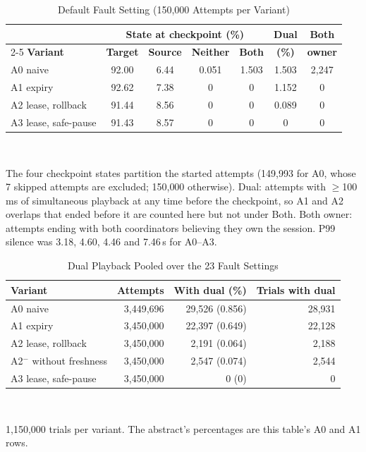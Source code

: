\documentclass[conference]{IEEEtran}
\begin{document}
\begin{table}[t]
\caption{Default Fault Setting (150{,}000 Attempts per Variant)}
\label{tab:default}
\centering
\footnotesize
\setlength{\tabcolsep}{3.2pt}
\begin{tabular}{@{}lcccccc@{}}
\toprule
 & \multicolumn{4}{c}{\textbf{State at checkpoint (\%)}} & \textbf{Dual} & \textbf{Both} \\
\cmidrule(lr){2-5}
\textbf{Variant} & \textbf{Target} & \textbf{Source} & \textbf{Neither} & \textbf{Both} & \textbf{(\%)} & \textbf{owner} \\
\midrule
A0 naive & 92.00 & 6.44 & 0.051 & 1.503 & 1.503 & 2{,}247 \\
A1 expiry & 92.62 & 7.38 & 0 & 0 & 1.152 & 0 \\
A2 lease, rollback & 91.44 & 8.56 & 0 & 0 & 0.089 & 0 \\
A3 lease, safe-pause & 91.43 & 8.57 & 0 & 0 & 0 & 0 \\
\bottomrule
\end{tabular}
\\[2pt]
\parbox{\columnwidth}{\scriptsize The four checkpoint states partition the started attempts (149{,}993 for A0, whose 7 skipped attempts are excluded; 150{,}000 otherwise). Dual: attempts with $\ge$100\,ms of simultaneous playback at any time before the checkpoint, so A1 and A2 overlaps that ended before it are counted here but not under Both. Both owner: attempts ending with both coordinators believing they own the session. P99 silence was 3.18, 4.60, 4.46 and 7.46\,s for A0--A3.}
\end{table}

\begin{table}[t]
\caption{Dual Playback Pooled over the 23 Fault Settings}
\label{tab:pooled}
\centering
\footnotesize
\begin{tabular}{@{}lrrr@{}}
\toprule
\textbf{Variant} & \textbf{Attempts} & \textbf{With dual (\%)} & \textbf{Trials with dual} \\
\midrule
A0 naive & 3{,}449{,}696 & 29{,}526 (0.856) & 28{,}931 \\
A1 expiry & 3{,}450{,}000 & 22{,}397 (0.649) & 22{,}128 \\
A2 lease, rollback & 3{,}450{,}000 & 2{,}191 (0.064) & 2{,}188 \\
A2$^-$ without freshness & 3{,}450{,}000 & 2{,}547 (0.074) & 2{,}544 \\
A3 lease, safe-pause & 3{,}450{,}000 & 0 (0) & 0 \\
\bottomrule
\end{tabular}
\\[2pt]
\parbox{\columnwidth}{\scriptsize 1{,}150{,}000 trials per variant. The abstract's percentages are this table's A0 and A1 rows.}
\end{table}
\end{document}
